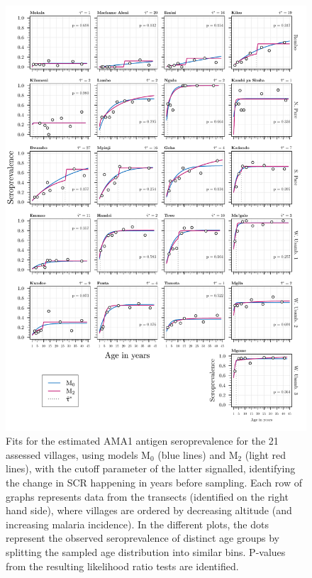 \begin{appendices}
\begin{figure}[H]
\center
\begin{adjustbox}{width=\linewidth,totalheight=\baselineskip}
\includegraphics[width=\columnwidth]{images/Seroprevalence_M0vM2_ama1.pdf}
\end{adjustbox}
\caption[Estimated AMA1 seroprevalence for models M$_0$ and M$_2$]{Fits for the estimated AMA1 antigen seroprevalence for the 21 assessed villages, using models M$_0$ (blue lines) and M$_2$ (light red lines), with the cutoff parameter of the latter signalled, identifying the change in SCR happening in years before sampling. Each row of graphs represents data from the transects (identified on the right hand side), where villages are ordered by decreasing altitude (and increasing malaria incidence). In the different plots, the dots represent the observed seroprevalence of distinct age groups by splitting the sampled age distribution into similar bins. P-values from the resulting likelihood ratio tests are identified.}
\label{fig:ama1.seroprevalence.M0.M2}
\end{figure}




\end{appendices}
